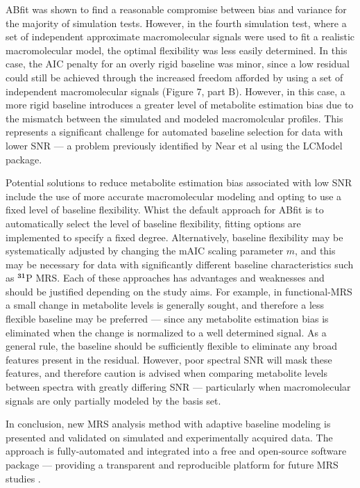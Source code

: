\documentclass[num-refs]{wiley-article}
\begin{document}
ABfit was shown to find a reasonable compromise between bias and variance for the majority of simulation tests. However, in the fourth simulation test, where a set of independent approximate macromolecular signals were used to fit a realistic macromolecular model, the optimal flexibility was less easily determined. In this case, the AIC penalty for an overly rigid baseline was minor, since a low residual could still be achieved through the increased freedom afforded by using a set of independent macromolecular signals (Figure 7, part B). However, in this case, a more rigid baseline introduces a greater level of metabolite estimation bias due to the mismatch between the simulated and modeled macromolcular profiles. This represents a significant challenge for automated baseline selection for data with lower SNR --- a problem previously identified by Near et al \cite{Near2013} using the LCModel package.

Potential solutions to reduce metabolite estimation bias associated with low SNR include the use of more accurate macromolecular modeling \cite{Birch2017} and opting to use a fixed level of baseline flexibility. Whist the default approach for ABfit is to automatically select the level of baseline flexibility, fitting options are implemented to specify a fixed degree. Alternatively, baseline flexibility may be systematically adjusted by changing the mAIC scaling parameter $m$, and this may be necessary for data with significantly different baseline characteristics such as $^{\textbf{31}}$P MRS. Each of these approaches has advantages and weaknesses and should be justified depending on the study aims. For example, in functional-MRS a small change in metabolite levels is generally sought, and therefore a less flexible baseline may be preferred --- since any metabolite estimation bias is eliminated when the change is normalized to a well determined signal. As a general rule, the baseline should be sufficiently flexible to eliminate any broad features present in the residual. However, poor spectral SNR will mask these features, and therefore caution is advised when comparing metabolite levels between spectra with greatly differing SNR --- particularly when macromolecular signals are only partially modeled by the basis set.

In conclusion, new MRS analysis method with adaptive baseline modeling is presented and validated on simulated and experimentally acquired data. The approach is fully-automated and integrated into a free and open-source software package --- providing a transparent and reproducible platform for future MRS studies \cite{Stikov2019}.
\end{document}
